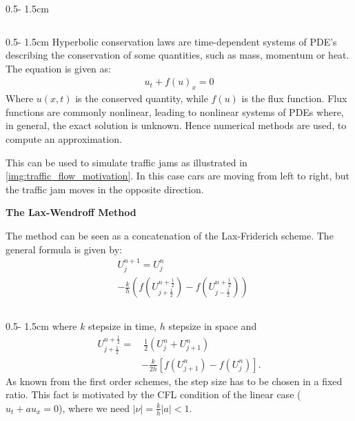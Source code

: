 \documentclass{uibposter}
\begin{document}
\begin{frame}[fragile]
\begin{columns}
\begin{column}{0.5\textwidth - 1.5cm}
\begin{column}{0.5\textwidth - 1.5cm}
Hyperbolic conservation laws are time-dependent systems of PDE's describing the conservation of some quantities, such as mass, momentum or heat. The equation is given as:
\begin{align*}
    u_t + f(u)_x = 0
\end{align*}
Where $u(x,t)$ is the conserved quantity, while $f(u)$ is the flux function. Flux functions are commonly nonlinear, leading to nonlinear systems of PDEs where, in general, the exact solution is unknown. Hence numerical methods are used, to compute an approximation. 

\vspace{0.5cm}
This can be used to simulate traffic jams as illustrated in \cref{img:traffic_flow_motivation}. In this case cars are moving from left to right, but the traffic jam moves in the opposite direction. 

\vspace{0.5cm}
\textbf{The Lax-Wendroff Method}

\vspace{0.5cm}
The method can be seen as a concatenation of the Lax-Friderich scheme.
The general formula is given by:
\begin{align*}
&U_j^{n+1} = U_j^n\\
&- \frac{k}{h}\left(f\left(U_{j+\frac{1}{2}}^{n+\frac{1}{2}}\right) - f\left(U_{j-\frac{1}{2}}^{n+\frac{1}{2}}\right)\right)
\end{align*}

\end{column}
\begin{column}{0.5\textwidth - 1.5cm}
where $k$ stepsize in time, $h$ stepsize in space and
\begin{align*}
U_{j+\frac{1}{2}}^{n+\frac{1}{2}} =&~ \frac{1}{2} (U_j^n + U_{j+1}^n)\\
&- \frac{k}{2h}[f(U_{j+1}^n) - f(U_j^n)].
\end{align*}
As known from the first order schemes, the step size has to be chosen in a fixed ratio. This fact is motivated by the CFL condition of the linear case ($u_t + au_x = 0$), where we need $|\nu| = \frac{k}{h} |a| < 1$. 


\end{column}
\end{column}
\end{columns}
\end{frame}
\end{document}

